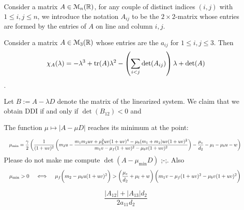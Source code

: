\begin{definition}
	Consider a matrix $A \in \EuScript{M}_n(\mathbb{R})$, for any couple of distinct indices $(i, j)$ with $1 \le i, j \le n$, we introduce the notation $A_{ij}$ to be the $2 \! \times \! 2$-matrix whose entries are formed by the entries of $A$ on line and column $i, j$.
\end{definition}


\begin{proposition} Consider a matrix $A \in \EuScript{M}_3(\mathbb{R})$ whose entries are the $a_{ij}$ for $1 \le i, j \le 3$. Then 
	$$\chi_A(\lambda) = -\lambda^3 + \mathrm{tr}(A) \lambda^2 - \left( \sum_{i < j} \mathrm{det}(A_{ij})\right) \lambda + \mathrm{det}(A)$$.
\end{proposition}


\begin{lemma} Let $B := A - \lambda D$ denote the matrix of the linearized system. We claim that we obtain DDI if and only if $\det(B_{12}) < 0$ and 
	
\end{lemma}


\begin{remark}[Minimum] The function $\mu \longmapsto |A - \mu D|$ reaches its minimum at the point:
	
\begin{equation}
	\resizebox{\hsize}{!}{%
		$\mu_{\mathbf{\mathrm{min}}} = \dfrac{\gamma}{2}\left( \dfrac{1}{(1+uv)^2}\left( m_2 u -  \dfrac{m_1m_2uv + \mu_b^2 uv(1+uv)^4 - \mu_b(m_1 + m_2) uv(1+uv)^2}{m_1 v - \mu_f (1 + uv)^2 - \mu_b v(1+uv)^2} \right)-\dfrac{\mu_e}{d_2} - \mu_l - \mu_b u - w\right) \notag$  
	}
\end{equation}
Please do not make me compute $\det(A - \mu_{\textrm{min}} D)$ ;-;. Also
\begin{equation}
	\resizebox{\hsize}{!}{%
		$\mu_{\mathbf{\mathrm{min}}} > 0 \quad \iff\quad \mu_f \biggl(m_2 - \mu_b u (1 + uv)^2\biggr) > \left( \dfrac{\mu_e}{d_2} + \mu_l + w \right) \biggl( m_1 v - \mu_f(1+uv)^2 - \mu_b v (1 + uv)^2\biggr) \notag$  
	}
\end{equation}
\end{remark}



$$\frac{|A_{12}| + |A_{13}|d_2}{2a_{11} d_2}$$



